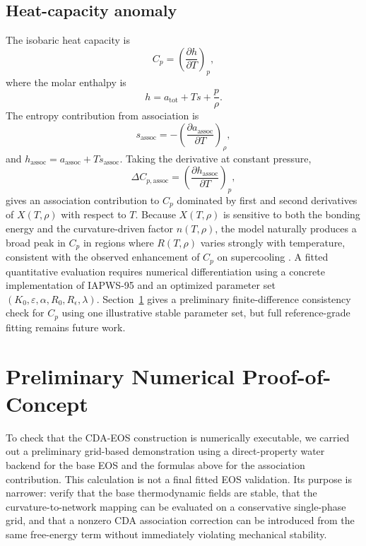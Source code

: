 \documentclass[12pt]{article}
\begin{document}
\subsection{Heat-capacity anomaly}

The isobaric heat capacity is
\begin{equation}
  C_p=\left(\frac{\partial h}{\partial T}\right)_p,
\end{equation}
where the molar enthalpy is
\begin{equation}
  h=a_{\mathrm{tot}}+Ts+\frac{p}{\rho}.
\end{equation}
The entropy contribution from association is
\begin{equation}
  s_{\mathrm{assoc}}=-\left(\frac{\partial a_{\mathrm{assoc}}}{\partial T}\right)_\rho,
\end{equation}
and $h_{\mathrm{assoc}}=a_{\mathrm{assoc}}+Ts_{\mathrm{assoc}}$. Taking the derivative at constant pressure,
\begin{equation}
  \Delta C_{p,\mathrm{assoc}}=\left(\frac{\partial h_{\mathrm{assoc}}}{\partial T}\right)_p,
\end{equation}
gives an association contribution to $C_p$ dominated by first and second derivatives of $X(T,\rho)$ with respect to $T$. Because $X(T,\rho)$ is sensitive to both the bonding energy and the curvature-driven factor $n(T,\rho)$, the model naturally produces a broad peak in $C_p$ in regions where $R(T,\rho)$ varies strongly with temperature, consistent with the observed enhancement of $C_p$ on supercooling \cite{Speedy1987,IAPWS15}. A fitted quantitative evaluation requires numerical differentiation using a concrete implementation of IAPWS-95 and an optimized parameter set $(K_0,\varepsilon,\alpha,R_0,R_\epsilon,\lambda)$. Section~\ref{sec:prelim-numerics} gives a preliminary finite-difference consistency check for $C_p$ using one illustrative stable parameter set, but full reference-grade fitting remains future work.


\section{Preliminary Numerical Proof-of-Concept}
\label{sec:prelim-numerics}

To check that the CDA-EOS construction is numerically executable, we carried out a preliminary grid-based demonstration using a direct-property water backend for the base EOS and the formulas above for the association contribution. This calculation is not a final fitted EOS validation. Its purpose is narrower: verify that the base thermodynamic fields are stable, that the curvature-to-network mapping can be evaluated on a conservative single-phase grid, and that a nonzero CDA association correction can be introduced from the same free-energy term without immediately violating mechanical stability.
\end{document}
